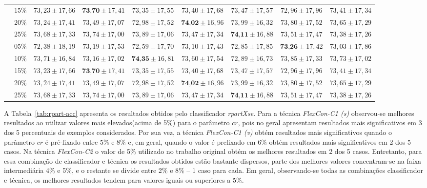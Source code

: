 \begin{table}[!ht]
{\begin{tabular}{|c|c|c|c|c|c|c|c|c|}
                 & 15\% & $73,23 \pm 17,66$ & $\textbf{73,70} \pm 17,41$ & $73,35 \pm 17,55$ & $73,40 \pm 17,68$ & $73,47 \pm 17,57$ & $72,96 \pm 17,96$ & $73,41 \pm 17,34$ \\
                 & 20\% & $73,24 \pm 17,41$ & $73,49 \pm 17,07$ & $72,98 \pm 17,52$ & $\textbf{74,02} \pm 16,96$ & $73,99 \pm 16,32$ & $73,80 \pm 17,52$ & $73,65 \pm 17,29$ \\
                 & 25\% & $73,68 \pm 17,33$ & $73,74 \pm 17,00$ & $73,89 \pm 17,06$ & $73,47 \pm 17,34$ & $\textbf{74,11} \pm 16,88$ & $73,51 \pm 17,47$ & $73,38 \pm 17,26$ \\ \hline
                \parbox[t]{3mm}{}
                 & 05\% & $72,38 \pm 18,19$ & $73,19 \pm 17,53$ & $72,59 \pm 17,70$ & $73,10 \pm 17,43$ & $72,85 \pm 17,85$ & $\textbf{73,26} \pm 17,42$ & $73,03 \pm 17,86$ \\
                 & 10\% & $73,71 \pm 16,84$ & $73,16 \pm 17,02$ & $\textbf{74,35} \pm 16,81$ & $73,60 \pm 17,54$ & $72,89 \pm 16,73$ & $73,85 \pm 17,33$ & $73,73 \pm 17,02$ \\
                 & 15\% & $73,23 \pm 17,66$ & $\textbf{73,70} \pm 17,41$ & $73,35 \pm 17,55$ & $73,40 \pm 17,68$ & $73,47 \pm 17,57$ & $72,96 \pm 17,96$ & $73,41 \pm 17,34$ \\
                 & 20\% & $73,24 \pm 17,41$ & $73,49 \pm 17,07$ & $72,98 \pm 17,52$ & $\textbf{74,02} \pm 16,96$ & $73,99 \pm 16,32$ & $73,80 \pm 17,52$ & $73,65 \pm 17,29$ \\
                 & 25\% & $73,68 \pm 17,33$ & $73,74 \pm 17,00$ & $73,89 \pm 17,06$ & $73,47 \pm 17,34$ & $\textbf{74,11} \pm 16,88$ & $73,51 \pm 17,47$ & $73,38 \pm 17,26$ \\ \hline
            \end{tabular}%
        }
        \label{tab:naive-acc}
    \end{table}
    
    A Tabela~\ref{tab:rpart-acc} apresenta os resultados obtidos pelo classificador \textit{rpartXse}. Para a técnica \textit{FlexCon\hyp{C1} (s)} observou\hyp{se} melhores resultados ao utilizar valores mais elevados(acima de 5\%) para o parâmetro $cr$, pois no geral apresentam resultados mais significativos em 3 dos 5 percentuais de exemplos considerados. Por sua vez, a técnica \textit{FlexCon\hyp{C1} (v)} obtém resultados mais significativos quando o parâmetro $cr$ é pré\hyp{fixado} entre 5\% e 8\% e, em geral, quando o valor é prefixado em 6\% obtém resultados mais significativos em 2 dos 5 casos. Na técnica \textit{FlexCon\hyp{C2}} o valor de 5\% utilizado no trabalho original obtém os melhores resultados em 2 dos 5 casos. Entretanto, para essa combinação de classificador e técnica os resultados obtidos estão bastante dispersos, parte dos melhores valores concentram\hyp{se} na faixa intermediária 4\% e 5\%, e o restante se divide entre 2\% e 8\% {--} 1 caso para cada. Em geral, observando\hyp{se} todas as combinações classificador e técnica, os melhores resultados tendem para valores iguais ou superiores a 5\%.
    
